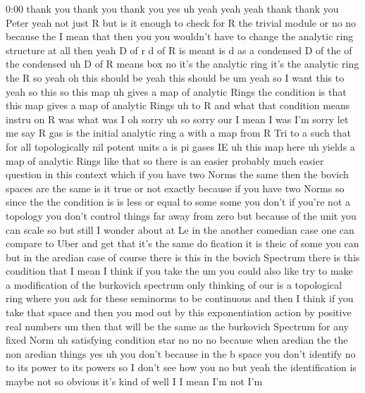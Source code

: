 \begin{unfinished}{0:00}
thank  you  thank  you  thank  you  yes  uh
yeah  yeah
yeah  thank  thank  you  Peter  yeah  not  just
R
but  is  it  enough  to  check  for  R  the
trivial  module  or  no  no  because  the  I
mean  that  then  you  you  wouldn't  have  to
change  the  analytic  ring  structure  at
all
then  yeah  D  of  r  d  of  R  is  meant  is  d  as
a
condensed  D  of  the  of  the  condensed
uh  D  of  R  means  box  no  it's  the  analytic
ring  it's  the  analytic  ring  the  R  so
yeah  oh  this  should  be  yeah  this  should
be  um  yeah  so  I  want  this  to  yeah  so
this  so  this  map  uh  gives  a  map  of
analytic  Rings  the  condition  is  that
this  map  gives  a  map  of  analytic  Rings
uh  to  R  and  what  that  condition  means
instru  on  R  was  what  was  I  oh  sorry  uh
so  sorry  our  I  mean  I  was  I'm  sorry  let
me  say  R  gas  is  the  initial  analytic
ring  a  with  a  map  from  R  Tri  to  a  such
that  for  all  topologically  nil  potent
units  a  is  pi  gases
IE  uh  this  map
here  uh  yields  a  map  of  analytic  Rings
like  that
so  there  is  an  easier  probably  much
easier  question  in  this  context  which  if
you  have  two
Norms  the  same  then  the  bovich  spaces
are  the  same  is  it  true  or  not  exactly
because  if  you  have  two  Norms  so  since
the  the  condition
is  is  less  or  equal  to
some  some  you  don't  if  you're  not  a
topology  you  don't  control  things  far
away  from  zero  but  because  of  the  unit
you  can  scale  so  but  still  I  wonder
about  at  Le  in  the  another  comedian  case
one  can  compare  to  Uber  and  get  that
it's  the  same  do  fication  it  is  theic  of
some  you  can  but  in  the  aredian  case  of
course  there  is  this  in  the  bovich
Spectrum  there  is  this  condition  that  I
mean  I  think  if  you  take  the  um  you
could  also  like  try  to  make  a
modification  of  the  burkovich  spectrum
only  thinking  of  our  is  a  topological
ring  where  you  ask  for  these  seminorms
to  be  continuous  and  then  I  think  if  you
take  that  space  and  then  you  mod  out  by
this  exponentiation  action  by  positive
real
numbers  um  then  that  will  be  the  same  as
the  burkovich  Spectrum  for  any  fixed
Norm  uh  satisfying  condition
star  no  no  no  because  when  aredian  the
the  non  aredian  things  yes  uh  you  don't
because  in  the  b  space  you  don't
identify  no  to  its  power  to  its  powers
so  I  don't  see  how  you  no  but  yeah  the
identification  is  maybe  not  so  obvious
it's  kind  of  well  I  I  mean  I'm  not  I'm

\end{unfinished}
